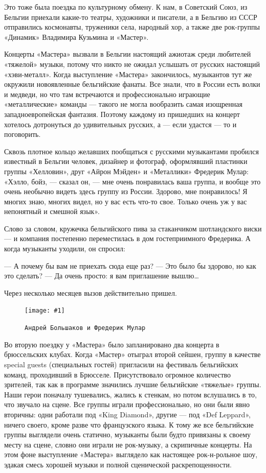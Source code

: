 \documentclass[16pt,a5paper]{book}
\newcommand{\myincludegraphics}[1]{\texttt{[image: \#1]}}
\begin{document}
Это тоже была поездка по культурному обмену. К нам, в Советский Союз, из Бельгии приехали какие-то театры, художники и
писатели, а в Бельгию из СССР отправились космонавты, труженики села, народный хор, а также две рок-группы «Динамик»
Владимира Кузьмина и «Мастер».

Концерты «Мастера» вызвали в Бельгии настоящий ажиотаж среди любителей «тяжелой» музыки, потому что никто не ожидал
услышать от русских настоящий «хэви-металл». Когда выступление «Мастера» закончилось, музыкантов тут же окружили
новоявленные бельгийские фанаты. Все знали, что в России есть волки и медведи, но что там встречаются и профессионально
играющие «металлические» команды — такого не могла вообразить самая изощренная западноевропейская фантазия. Поэтому
каждому из пришедших на концерт хотелось дотронуться до удивительных русских, а — если удастся — то и поговорить.

Сквозь плотное кольцо желавших пообщаться с русскими музыкантами пробился известный в Бельгии человек, дизайнер и
фотограф, оформлявший пластинки группы «Хелловин», друг «Айрон Мэйден» и «Металлики» Фредерик Мулар: «Хэлло, бойз, —
сказал он, — мне очень понравилась ваша группа, и вообще это очень необычно видеть здесь группу из России. Здорово, мне
понравилось! Я многих знаю, многих видел, но у вас есть что-то свое. Только очень уж у вас непонятный и смешной язык».

Слово за словом, кружечка бельгийского пива за стаканчиком шотландского виски — и компания постепенно переместилась в
дом гостеприимного Фредерика. А когда музыканты уходили, он спросил:

— А почему бы вам не приехать сюда еще раз?
— Это было бы здорово, но как это сделать?
— Да очень просто: я вам приглашение вышлю\ldots

Через несколько месяцев вызов действительно пришел.

\begin{figure}
    \centering
    \myincludegraphics{Image23}
    \caption{\texttt{Андрей Большаков и Фредерик Мулар}}
\end{figure}

Во вторую поездку у «Мастера» было запланировано два концерта в брюссельских клубах. Когда «Мастер» отыграл второй
сейшен, группу в качестве special guests (специальных гостей) пригласили на фестиваль бельгийских команд, проходивший в
Брюсселе. Присутствовало огромное количество зрителей, так как в программе значились лучшие бельгийские «тяжелые»
группы. Наши герои поначалу тушевались, жались к стенкам, но потом вслушались в то, что звучало на сцене. Все группы
играли профессионально, но они были явно вторичны: одни работали под «King Diamond», другие — под «Def Leppard», ничего
своего, кроме разве что французского языка. К тому же все бельгийские группы выглядели очень статично, музыканты были
будто привязаны к своему месту на сцене, словно они играли не рок-музыку, а скрипичные концерты. На этом фоне
выступление «Мастера» выглядело как настоящее рок-н-рольное шоу, эдакая смесь хорошей музыки и полной сценической
раскрепощенности.
\end{document}
